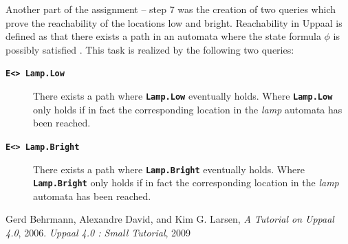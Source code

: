 \documentclass{article}
\newcommand{\code}[1]{\texttt{\textbf{#1}}}
\begin{document}
Another part of the assignment -- step 7 was the creation of two queries which prove the reachability of the locations low and bright. Reachability in Uppaal is defined as that there exists a path in an automata where the state formula $\phi$ is possibly satisfied \cite{Tut01}. This task is realized by the following two queries:

\begin{description}
	\item[\code{E<> Lamp.Low}] There exists a path where \code{Lamp.Low} eventually holds. Where \code{Lamp.Low} only holds if in fact the corresponding location in the \textit{lamp} automata has been reached.
	\item[\code{E<> Lamp.Bright}] There exists a path where \code{Lamp.Bright} eventually holds.
	Where \code{Lamp.Bright} only holds if in fact the corresponding location in the \textit{lamp} automata has been reached.
\end{description}


\begin{thebibliography}{2}
	 Gerd Behrmann, Alexandre David, and Kim G. Larsen, \textit{A Tutorial on Uppaal 4.0}, 2006.
	 \textit{Uppaal 4.0 : Small Tutorial}, 2009
\end{thebibliography}

\end{document}
